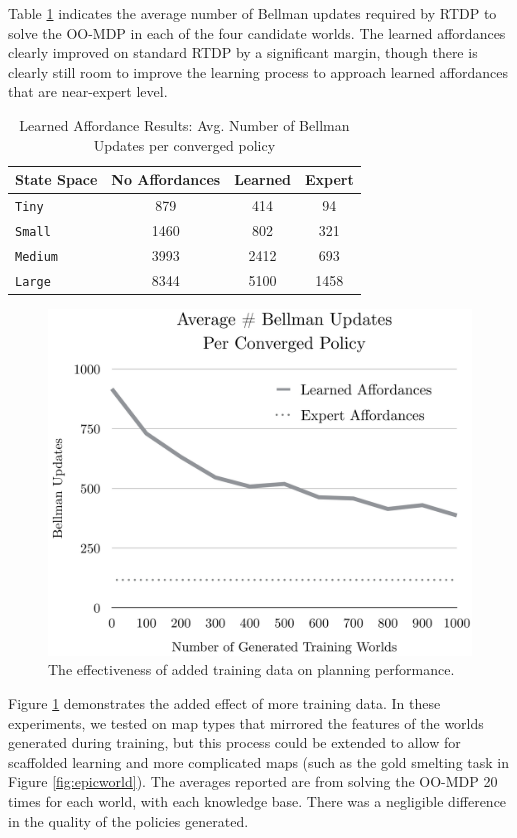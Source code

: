 \documentclass[letterpaper]{article}
\begin{document}
Table \ref{table:learned-results} indicates the average number of Bellman updates required by RTDP to solve the OO-MDP
in each of the four candidate worlds. The learned affordances clearly improved on standard RTDP by a significant margin, though
there is clearly still room to improve the learning process to approach learned affordances that are near-expert level.
\begin{table}
\centering
\begin{tabular}{ l || c c c }
  State Space & No Affordances & Learned & Expert  \\ \hline
  \texttt{Tiny}  		& 	879		&	414	&	 94	\\
  \texttt{Small}  	& 	1460		&	802	&	321  \\
  \texttt{Medium}  	& 	3993		&	2412	&	693  \\
  \texttt{Large}  	& 	8344		&	5100	&	1458
\end{tabular}
\caption{Learned Affordance Results: Avg. Number of Bellman Updates per converged policy}
\label{table:learned-results}
\end{table}

\begin{figure}[b]
\centering
\includegraphics[scale=0.195]{figures/training_results.png}%
  \caption{The effectiveness of added training data on planning performance.}
  \label{fig:training_results}
\end{figure}

Figure \ref{fig:training_results} demonstrates the added effect of more training data. In these experiments, we tested on map types that mirrored the features of the worlds generated during training, but this process could be extended to allow for scaffolded learning and more complicated maps (such as the gold smelting task in Figure \ref{fig:epicworld}). The averages reported are from solving the OO-MDP 20 times for each world, with each knowledge base. There was a negligible difference in the quality of the policies generated.
\end{document}
